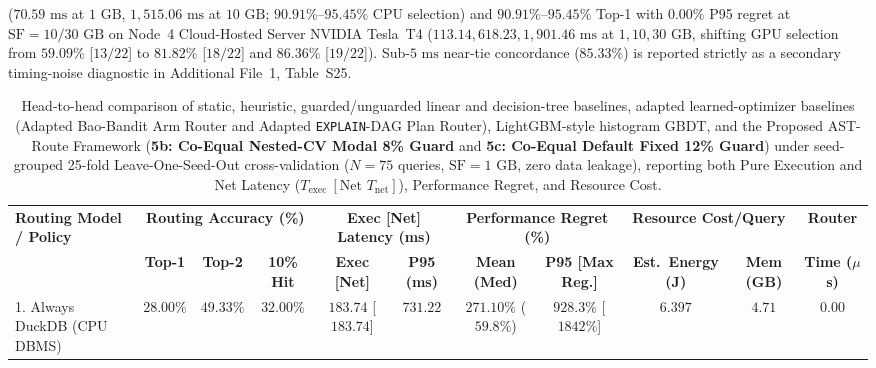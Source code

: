 \documentclass[10pt,a4paper]{article}
\newenvironment{fitasttable}{%
  \begin{lrbox}{\asttblbox}%
}{%
  \end{lrbox}%
  \sbox{\asttblboxB}{%
    \ifdim\wd\asttblbox>0.96\textwidth
      \resizebox{0.96\textwidth}{!}{\usebox{\asttblbox}}%
    \else
      \usebox{\asttblbox}%
    \fi
  }%
  \ifdim\ht\asttblboxB>0.72\textheight
    \resizebox{!}{0.72\textheight}{\usebox{\asttblboxB}}%
  \else
    \usebox{\asttblboxB}%
  \fi
}
\begin{document}
\begin{enumerate}[leftmargin=1.5em,itemsep=1pt]
($70.59\text{ ms}$ at $1\text{ GB}$, $1{,}515.06\text{ ms}$ at $10\text{ GB}$; $90.91\%\text{--}95.45\%$ CPU selection) and $\mathbf{90.91\%\text{--}95.45\%}$ Top-1 with $\mathbf{0.00\%}$ P95 regret at $\text{SF}=10/30\text{ GB}$ on Node~4 Cloud-Hosted Server NVIDIA Tesla~T4 ($113.14, 618.23, 1{,}901.46\text{ ms}$ at $1, 10, 30\text{ GB}$, shifting GPU selection from $\mathbf{59.09\%}$ [$13/22$] to $\mathbf{81.82\%}$ [$18/22$] and $\mathbf{86.36\%}$ [$19/22$]). Sub-$5\text{ ms}$ near-tie concordance ($85.33\%$) is reported strictly as a secondary timing-noise diagnostic in Additional File~1, Table~S25.
\end{enumerate}

\begin{table}[!htbp]
\centering
\caption{Head-to-head comparison of static, heuristic, guarded/unguarded linear and decision-tree baselines, adapted learned-optimizer baselines (Adapted Bao-Bandit Arm Router and Adapted \texttt{EXPLAIN}-DAG Plan Router), LightGBM-style histogram GBDT, and the Proposed AST-Route Framework (\textbf{5b: Co-Equal Nested-CV Modal 8\% Guard} and \textbf{5c: Co-Equal Default Fixed 12\% Guard}) under seed-grouped 25-fold Leave-One-Seed-Out cross-validation ($N=75$ queries, $\text{SF}=1\text{ GB}$, zero data leakage), reporting both Pure Execution and Net Latency ($T_{\text{exec}}\ [\text{Net } T_{\text{net}}]$), Performance Regret, and Resource Cost.}\label{tab:jbd_routing_t8}
\label{tab:routing_evaluation}\label{tab:query_routing}\label{tab:router_eval}
\scriptsize
\setlength{\tabcolsep}{2.7pt}
\renewcommand{\arraystretch}{1.07}
\begin{fitasttable}
\begin{tabular}{@{}lcccccccccc@{}}
\toprule
\multirow{2}{*}{\textbf{Routing Model / Policy}} & \multicolumn{3}{c}{\textbf{Routing Accuracy (\%)}} & \multicolumn{2}{c}{\textbf{Exec [Net] Latency (ms)}} & \multicolumn{2}{c}{\textbf{Performance Regret (\%)}} & \multicolumn{2}{c}{\textbf{Resource Cost/Query}} & \textbf{Router} \\
\cmidrule(lr){2-4} \cmidrule(lr){5-6} \cmidrule(lr){7-8} \cmidrule(lr){9-10} \cmidrule(lr){11-11}
 & \textbf{Top-1} & \textbf{Top-2} & \textbf{10\% Hit} & \textbf{Exec [Net]} & \textbf{P95 (ms)} & \textbf{Mean (Med)} & \textbf{P95 [Max Reg.]} & \textbf{Est.\ Energy (J)} & \textbf{Mem (GB)} & \textbf{Time ($\mu$s)} \\
\midrule
1. Always DuckDB (CPU DBMS) & $28.00\%$ & $49.33\%$ & $32.00\%$ & $183.74$ [$183.74$] & $731.22$ & $271.10\%$ ($59.8\%$) & $928.3\%$ [$1842\%$] & $6.397$ & $4.71$ & $0.00$ \\

\end{tabular}
\end{fitasttable}
\end{table}
\end{document}
